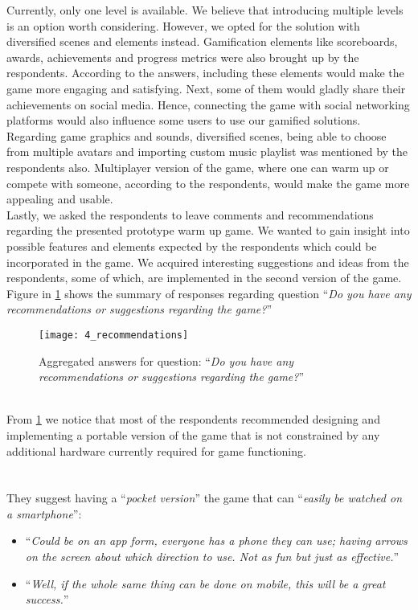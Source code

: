 Currently, only one level is available. We believe that introducing multiple levels is an option worth considering. However, we opted for the solution with diversified scenes and elements instead. Gamification elements like scoreboards, awards, achievements and progress metrics were also brought up by the respondents. %
According to the answers, including these elements would make the game more engaging and satisfying. Next, some of them would gladly share their achievements on social media. Hence, connecting the game with social networking platforms would also influence some users to use our gamified solutions. Regarding game graphics and sounds, diversified scenes, being able to choose from multiple avatars and importing custom music playlist was mentioned by the respondents also. Multiplayer version of the game, where one can warm up or compete with someone, according to the respondents, would make the game more appealing and usable.\\ 
Lastly, we asked the respondents to leave comments and recommendations regarding the presented prototype warm up game. We wanted to gain insight into possible features and elements expected by the respondents which could be incorporated in the game. We acquired interesting suggestions and ideas from the respondents, some of which, are implemented in the second version of the game. Figure in \ref{fig:4_recommendations} shows the summary of responses regarding question ``\textit{Do you have any recommendations or suggestions regarding the game?}''\\
\begin{figure}[h]
    \centering
    \texttt{[image: 4\_recommendations]}
    \caption{Aggregated answers for question: ``\textit{Do you have any recommendations or suggestions regarding the game?}''}
    \label{fig:4_recommendations}
\end{figure}\\ 
From \ref{fig:4_recommendations} we notice that most of the respondents recommended designing and implementing a portable version of the game that is not constrained by any additional hardware currently required for game functioning.\\ \\ \\They suggest having a ``\textit{pocket version}'' the game that can ``\textit{easily be watched on a smartphone}'':
\begin{itemize}
\item ``\textit{Could be on an app form, everyone has a phone they can use; having arrows on the screen about which direction to use. Not as fun but just as effective.}''
\item ``\textit{Well, if the whole same thing can be done on mobile, this will be a great success.}''
\end{itemize}
